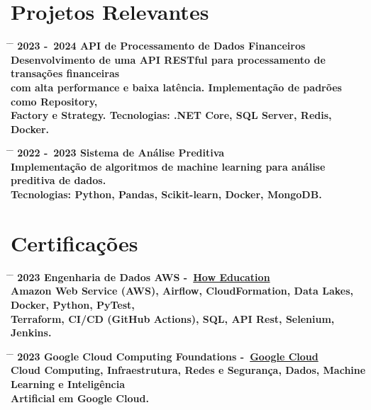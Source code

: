\documentclass{article}
\begin{document}
\section*{Projetos Relevantes}

\begin{tabbing}
	\hspace{2cm} \= \hspace{4cm} \= \kill
	\bf{2023 -\ 2024} \> \textbf{API de Processamento de Dados Financeiros} \\
	\> Desenvolvimento de uma API RESTful para processamento de transações financeiras \\
	\> com alta performance e baixa latência. Implementação de padrões como Repository, \\
	\> Factory e Strategy. \textbf{Tecnologias:} {.NET Core}, SQL Server, Redis, Docker. \\
\end{tabbing}

\begin{tabbing}
	\hspace{2cm} \= \hspace{4cm} \= \kill
	\bf{2022 -\ 2023} \> \textbf{Sistema de Análise Preditiva} \\
	\> Implementação de algoritmos de machine learning para análise preditiva de dados. \\
	\> \textbf{Tecnologias:} Python, Pandas, Scikit-learn, Docker, {MongoDB}. \\
\end{tabbing}

\section*{Certificações}

\begin{tabbing}
	\hspace{2cm} \= \hspace{4cm} \= \kill
	\bf{2023} \> \textbf{Engenharia de Dados AWS} -~\href{https://howedu.com.br/}{How Education} \\
	\> Amazon Web Service (AWS), Airflow, CloudFormation, Data Lakes, Docker, Python, PyTest, \\
	\> Terraform, CI/CD (GitHub Actions), SQL, API Rest, Selenium, Jenkins. \\
\end{tabbing}

\begin{tabbing}
	\hspace{2cm} \= \hspace{4cm} \= \kill
	\bf{2023} \> \textbf{Google Cloud Computing Foundations} -~\href{https://www.cloudskillsboost.google/public_profiles/3a03b48f-00f0-42a3-9800-4c045d78b21e/badges/3540421}{Google Cloud} \\
	\> Cloud Computing, Infraestrutura, Redes e Segurança, Dados, Machine Learning e Inteligência \\
	\> Artificial em Google Cloud. \\
\end{tabbing}
\end{document}
